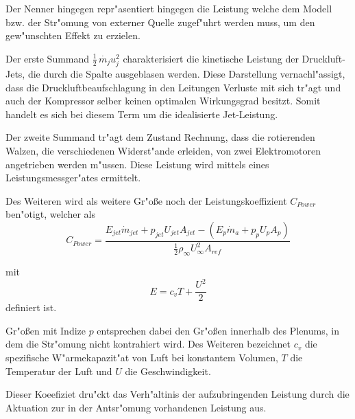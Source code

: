 Der Nenner hingegen repr"asentiert hingegen die Leistung welche dem Modell bzw. der Str"omung von externer Quelle zugef"uhrt werden muss, um den gew"unschten Effekt zu erzielen.

Der erste Summand $\frac{1}{2}\,\dot{m_j} u_j^2$ charakterisiert die kinetische Leistung der Druckluft-Jets, die durch die Spalte ausgeblasen werden. Diese Darstellung vernachl"assigt, dass die  Druckluftbeaufschlagung in den Leitungen Verluste mit sich tr"agt und auch der Kompressor selber keinen optimalen Wirkungsgrad besitzt. Somit handelt es sich bei diesem Term um die idealisierte Jet-Leistung.

Der zweite Summand tr"agt dem Zustand Rechnung, dass die rotierenden Walzen, die verschiedenen Widerst"ande erleiden, von zwei Elektromotoren angetrieben werden m"ussen.
Diese Leistung wird mittels eines Leistungsmessger"ates ermittelt.


Des Weiteren wird als weitere Gr"o\ss{}e noch der Leistungskoeffizient $C_{Power}$ ben"otigt, welcher als
	\begin{equation}
	\label{eq:def-powercoefficient}
		C_{Power} = \frac{E_{jet}\dot{m}_{jet} + p_{jet}U_{jet}A_{jet} - (E_p\dot{m}_a + p_p U_p A_p)}{\frac{1}{2}\rho_{\infty}U^2_{\infty} A_{ref}}
	\end{equation}

mit
	\begin{equation}
	\label{eq:def-energieterm}
		E = c_vT + \frac{U^2}{2}
	\end{equation}		
definiert ist.

Gr"o\ss{}en mit Indize $p$ entsprechen dabei den Gr"o\ss{}en innerhalb des Plenums, in dem die Str"omung nicht kontrahiert wird.
Des Weiteren bezeichnet $c_v$ die spezifische W"armekapazit"at von Luft bei konstantem Volumen, $T$ die Temperatur der Luft und $U$ die Geschwindigkeit.

Dieser Koeefiziet dru"ckt das Verh"altinis der aufzubringenden Leistung durch die Aktuation zur in der Antsr"omung vorhandenen Leistung aus.


